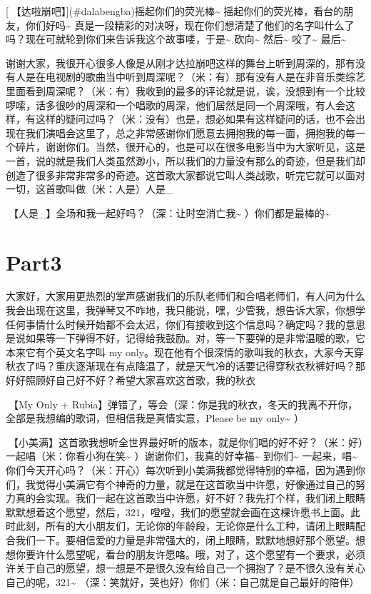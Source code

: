 \documentclass[
]{book}
\begin{document}
[🎵【达啦崩吧】](#dalabengba)摇起你们的荧光棒\textasciitilde{} 摇起你们的荧光棒，看台的朋友，你们好吗\textasciitilde{} 真是一段精彩的对决呀，现在你们想清楚了他们的名字叫什么了吗？现在可就轮到你们来告诉我这个故事喽，于是\textasciitilde{} 砍向\textasciitilde{} 然后\textasciitilde{} 咬了\textasciitilde{} 最后\textasciitilde{}

谢谢大家，我很开心很多人像是从刚才达拉崩吧这样的舞台上听到周深的，那有没有人是在电视剧的歌曲当中听到周深呢？（米：有）那有没有人是在非音乐类综艺里面看到周深呢？（米：有）我收到的最多的评论就是说，诶，没想到有一个比较啰嗦，话多很吵的周深和一个唱歌的周深，他们居然是同一个周深哦，有人会这样，有这样的疑问过吗？（米：没有）也是，想必如果有这样疑问的话，也不会出现在我们演唱会这里了，总之非常感谢你们愿意去拥抱我的每一面，拥抱我的每一个碎片，谢谢你们。当然，很开心的，也是可以在很多电影当中为大家听见，这是一首，说的就是我们人类虽然渺小，所以我们的力量没有那么的奇迹，但是我们却创造了很多非常非常多的奇迹。这首歌大家都说它叫人类战歌，听完它就可以面对一切，这首歌叫做（米：人是）人是\_

🎵【人是\_】全场和我一起好吗？（深：让时空消亡我\textasciitilde{} ）你们都是最棒的\textasciitilde{}

\section{Part3}\label{chongqing-20241007-part3}

大家好，大家用更热烈的掌声感谢我们的乐队老师们和合唱老师们，有人问为什么我会出现在这里，我弹琴又不咋地，我只能说，嘿，少管我，想告诉大家，你想学任何事情什么时候开始都不会太迟，你们有接收到这个信息吗？确定吗？我的意思是说如果等一下弹得不好，记得给我鼓励。对，等一下要弹的是非常温暖的歌，它本来它有个英文名字叫 my only。现在他有个很深情的歌叫我的秋衣，大家今天穿秋衣了吗？重庆逐渐现在有点降温了，就是天气冷的话要记得穿秋衣秋裤好吗？那好好照顾好自己好不好？希望大家喜欢这首歌，我的秋衣

🎵【My Only + Rubia】弹错了，等会（深：你是我的秋衣，冬天的我离不开你，全部是我想编的歌词，但相信我是真情实意，Please be my only\textasciitilde{} ）

🎵【小美满】这首歌我想听全世界最好听的版本，就是你们唱的好不好？（米：好）一起唱（米：你看小狗在笑\textasciitilde{} ）谢谢你们，我真的好幸福\textasciitilde{} 到你们\textasciitilde{} 一起来，唱\textasciitilde{} 你们今天开心吗？（米：开心）每次听到小美满我都觉得特别的幸福，因为遇到你们，我觉得小美满它有个神奇的力量，就是在这首歌当中许愿，好像通过自己的努力真的会实现。我们一起在这首歌当中许愿，好不好？我先打个样，我们闭上眼睛默默想着这个愿望，然后，321，噔噔，我们的愿望就会画在这棵许愿书上面。此时此刻，所有的大小朋友们，无论你的年龄段，无论你是什么工种，请闭上眼睛配合我们一下。要相信爱的力量是非常强大的，闭上眼睛，默默地想好那个愿望。想想你要许什么愿望呢，看台的朋友许愿咯。哦，对了，这个愿望有一个要求，必须许关于自己的愿望，想一想是不是很久没有给自己一个拥抱了？是不很久没有关心自己的呢，321\textasciitilde{} （深：笑就好，哭也好）你们（米：自己就是自己最好的陪伴）
\end{document}
